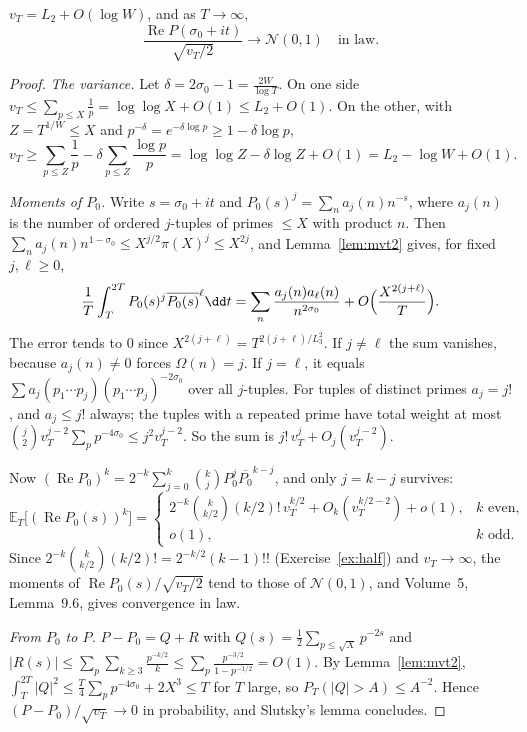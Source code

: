\begin{proposition}\label{prop:primesgauss}
$v_T=L_2+O(\log W)$, and as $T\to\infty$,
\[
\frac{\operatorname{Re}P(\sigma_0+it)}{\sqrt{v_T/2}}\longrightarrow\mathcal N(0,1)\quad\text{in law}.
\]
\end{proposition}
\begin{proof}
\emph{The variance.} Let $\delta=2\sigma_0-1=\frac{2W}{\log T}$. On one side $v_T\le\sum_{p\le X}\frac1p=\log\log X+O(1)\le L_2+O(1)$. On the other, with $Z=T^{1/W}\le X$ and $p^{-\delta}=e^{-\delta\log p}\ge1-\delta\log p$,
\[
v_T\ge\sum_{p\le Z}\frac1p-\delta\sum_{p\le Z}\frac{\log p}p=\log\log Z-\delta\log Z+O(1)=L_2-\log W+O(1).
\]

\emph{Moments of $P_0$.} Write $s=\sigma_0+it$ and $P_0(s)^j=\sum_na_j(n)n^{-s}$, where $a_j(n)$ is the number of ordered $j$-tuples of primes $\le X$ with product $n$. Then $\sum_na_j(n)n^{1-\sigma_0}\le X^{j/2}\pi(X)^j\le X^{2j}$, and Lemma~\ref{lem:mvt2} gives, for fixed $j,\ell\ge0$,
\[
\frac1T\int_T^{2T}P_0(s)^j\overline{P_0(s)}^\ell\dd t=\sum_n\frac{a_j(n)a_\ell(n)}{n^{2\sigma_0}}+O\Bigl(\frac{X^{2(j+\ell)}}T\Bigr).
\]
The error tends to $0$ since $X^{2(j+\ell)}=T^{2(j+\ell)/L_3^2}$. If $j\ne\ell$ the sum vanishes, because $a_j(n)\ne0$ forces $\Omega(n)=j$. If $j=\ell$, it equals $\sum a_j(p_1\cdots p_j)(p_1\cdots p_j)^{-2\sigma_0}$ over all $j$-tuples. For tuples of distinct primes $a_j=j!$, and $a_j\le j!$ always; the tuples with a repeated prime have total weight at most $\binom j2v_T^{j-2}\sum_pp^{-4\sigma_0}\le j^2v_T^{j-2}$. So the sum is $j!\,v_T^j+O_j(v_T^{j-2})$.

Now $(\operatorname{Re}P_0)^k=2^{-k}\sum_{j=0}^k\binom kjP_0^j\overline{P_0}^{k-j}$, and only $j=k-j$ survives:
\[
\mathbb E_T\bigl[(\operatorname{Re}P_0(s))^k\bigr]=\begin{cases}2^{-k}\binom k{k/2}(k/2)!\,v_T^{k/2}+O_k(v_T^{k/2-2})+o(1),&k\text{ even},\\o(1),&k\text{ odd}.\end{cases}
\]
Since $2^{-k}\binom k{k/2}(k/2)!=2^{-k/2}(k-1)!!$ (Exercise~\ref{ex:half}) and $v_T\to\infty$, the moments of $\operatorname{Re}P_0(s)/\sqrt{v_T/2}$ tend to those of $\mathcal N(0,1)$, and Volume~5, Lemma~9.6, gives convergence in law.

\emph{From $P_0$ to $P$.} $P-P_0=Q+R$ with $Q(s)=\frac12\sum_{p\le\sqrt X}p^{-2s}$ and $|R(s)|\le\sum_p\sum_{k\ge3}\frac{p^{-k/2}}k\le\sum_p\frac{p^{-3/2}}{1-p^{-1/2}}=O(1)$. By Lemma~\ref{lem:mvt2}, $\int_T^{2T}|Q|^2\le\frac T4\sum_pp^{-4\sigma_0}+2X^3\le T$ for $T$ large, so $P_T(|Q|>A)\le A^{-2}$. Hence $(P-P_0)/\sqrt{v_T}\to0$ in probability, and Slutsky's lemma concludes.
\end{proof}

